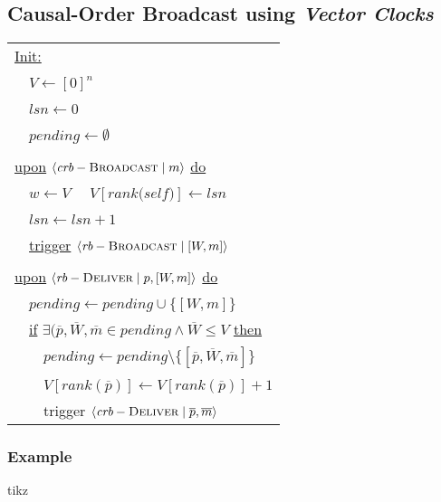 \documentclass{article}
\begin{document}
\begin{adjustwidth}{2em}{2em}
		\subsection{Causal-Order Broadcast using \textit{Vector Clocks}}
		\begin{adjustwidth}{2em}{2em}
			\begin{center}
				\begin{tabular}{l}
					\underline{Init:} \\
					\ \ $V \leftarrow [0]^{n}$ \\
					\ \ $lsn \leftarrow 0$ \\
					\ \ $\textit{pending} \leftarrow \emptyset$ \\
					\\
					\underline{upon} $\langle \textit{crb}-\textsc{Broadcast} \mid m \rangle$ \underline{do} \\
					\ \ $w \leftarrow V$
					\ \ $V[\textit{rank(self)}] \leftarrow lsn$ \\
					\ \ $lsn \leftarrow lsn + 1$ \\
					\ \ \underline{trigger} $\langle \textit{rb}-\textsc{Broadcast} \mid [W,m] \rangle$ \\
					\\
					\underline{upon} $\langle \textit{rb}-\textsc{Deliver} \mid p, [W,m] \rangle$ \underline{do} \\
					\ \ $\textit{pending} \leftarrow \textit{pending} \cup \{ [ W,m ] \}$ \\
					\ \ \underline{if} $\exists (\overline{p}, \overline{W}, \overline{m} \in \textit{pending} \wedge \overline{W} \leq V$ \underline{then} \\
					\ \ \ \ $\textit{pending} \leftarrow \textit{pending} \setminus \{ [ \overline{p}, \overline{W}, \overline{m} ] \}$ \\
					\ \ \ \ $ V[ \textit{rank}(\overline{p}) ] \leftarrow V[ \textit{rank}(\overline{p}) ] + 1 $ \\
					\ \ \ \ trigger $\langle \textit{crb}-\textsc{Deliver} \mid \overline{p}, \overline{m} \rangle$
				\end{tabular}
			\end{center}
			\subsubsection{Example}
			\begin{adjustwidth}{2em}{}
				tikz
			\end{adjustwidth}
		\end{adjustwidth}

\end{adjustwidth}
\end{document}
